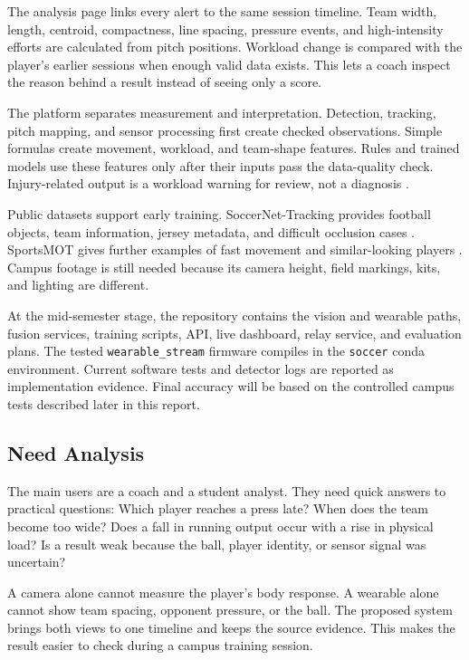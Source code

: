 The analysis page links every alert to the same session timeline. Team width,
length, centroid, compactness, line spacing, pressure events, and high-intensity
efforts are calculated from pitch positions. Workload change is compared with
the player's earlier sessions when enough valid data exists. This lets a coach
inspect the reason behind a result instead of seeing only a score.

The platform separates measurement and interpretation. Detection, tracking,
pitch mapping, and sensor processing first create checked observations. Simple
formulas create movement, workload, and team-shape features. Rules and trained
models use these features only after their inputs pass the data-quality check.
Injury-related output is a workload warning for review, not a diagnosis
\cite{leckey2025injury}.

Public datasets support early training. SoccerNet-Tracking provides football
objects, team information, jersey metadata, and difficult occlusion cases
\cite{cioppa2022soccernet}. SportsMOT gives further examples of fast movement
and similar-looking players \cite{cui2023sportsmot}. Campus footage is still
needed because its camera height, field markings, kits, and lighting are
different.

At the mid-semester stage, the repository contains the vision and wearable
paths, fusion services, training scripts, API, live dashboard, relay service,
and evaluation plans. The tested \texttt{wearable\_stream} firmware compiles in
the \texttt{soccer} conda environment. Current software tests and detector logs are reported as
implementation evidence. Final accuracy will be based on the controlled campus
tests described later in this report.

\subsection{Need Analysis}
The main users are a coach and a student analyst. They need quick answers to
practical questions: Which player reaches a press late? When does the team
become too wide? Does a fall in running output occur with a rise in physical
load? Is a result weak because the ball, player identity, or sensor signal was
uncertain?

A camera alone cannot measure the player's body response. A wearable alone
cannot show team spacing, opponent pressure, or the ball. The proposed system
brings both views to one timeline and keeps the source evidence. This makes the
result easier to check during a campus training session.

